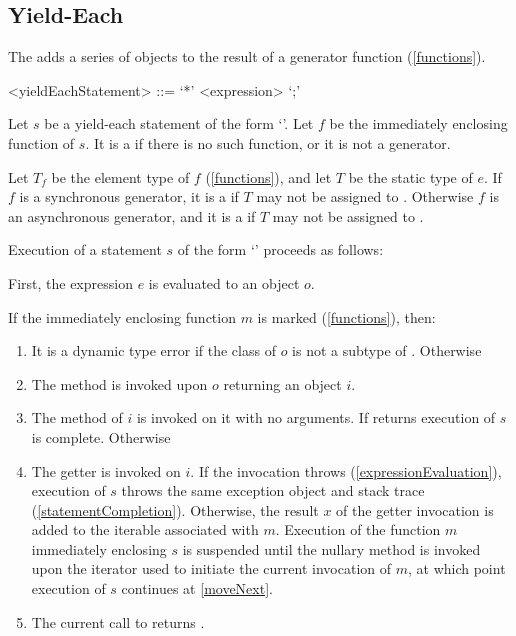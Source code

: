 \documentclass[makeidx]{article}
\begin{document}
{\subsection{Yield-Each}

\LMHash{}%
The  adds a series of objects to
the result of a generator function
(\ref{functions}).

\begin{grammar}
<yieldEachStatement> ::= \YIELD{} `*' <expression> `;'
\end{grammar}

\LMHash{}%
Let $s$ be a yield-each statement of the form `'.
Let $f$ be the immediately enclosing function of $s$.
It is a  if there is no such function,
or it is not a generator.

\LMHash{}%
Let $T_f$ be the element type of $f$
(\ref{functions}),
and let $T$ be the static type of $e$.
If $f$ is a synchronous generator,
it is a  if $T$ may not be assigned to
.
Otherwise $f$ is an asynchronous generator,
and it is a  if $T$ may not be assigned to
.

\LMHash{}%
Execution of a statement $s$ of the form `'
proceeds as follows:

\LMHash{}%
First, the expression $e$ is evaluated to an object $o$.

\LMHash{}%
If the immediately enclosing function $m$ is marked \code{\SYNC*}
(\ref{functions}),
then:
\begin{enumerate}
\item
  It is a dynamic type error
  if the class of $o$ is not a subtype of .
  Otherwise
\item
  The method  is invoked upon $o$ returning an object $i$.
\item
  \label{moveNext} The  method of $i$ is invoked on it
  with no arguments.
  If  returns \FALSE{} execution of $s$ is complete.
  Otherwise
\item
  The getter  is invoked on $i$.
  If the invocation throws
  (\ref{expressionEvaluation}),
  execution of $s$ throws the same exception object and stack trace
  (\ref{statementCompletion}).
  Otherwise, the result $x$ of the getter invocation is added to
  the iterable associated with $m$.
  Execution of the function $m$ immediately enclosing $s$ is suspended
  until the nullary method  is invoked
  upon the iterator used to initiate the current invocation of $m$,
  at which point execution of $s$ continues at \ref{moveNext}.
\item
The current call to  returns \TRUE.
\end{enumerate}

}
\end{document}

